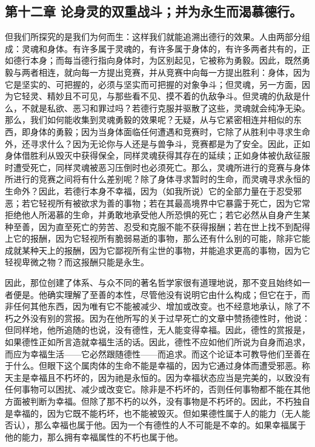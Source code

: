 
\subsection{第十二章 论身灵的双重战斗；并为永生而渴慕德行。}

但我们所探究的是我们为何而生：这样我们就能追溯出德行的效果。人由两部分组成：灵魂和身体。有许多属于灵魂的，有许多属于身体的，有许多两者共有的，正如德行本身；而每当德行指向身体时，为区别起见，它被称为勇毅。因此，既然勇毅与两者相连，就向每一方提出竞赛，并从竞赛中向每一方提出胜利：身体，因为它是坚实的、可把握的，必须与坚实而可把握的对象争斗；但灵魂，另一方面，因为它轻灵、精妙且不可见，与那些看不见、摸不着的仇敌争斗。但灵魂的仇敌是什么，不就是私欲、恶习和罪过吗？若德行克服并驱散了这些，灵魂就会纯净无染。那么，我们如何能收集到灵魂勇毅的效果呢？无疑，从与它紧密相连并相似的东西，即身体的勇毅；因为当身体面临任何遭遇和竞赛时，它除了从胜利中寻求生命外，还寻求什么？因为无论你与人还是与兽争斗，竞赛都是为了安全。因此，正如身体借胜利从毁灭中获得保全，同样灵魂获得其存在的延续；正如身体被仇敌征服时遭受死亡，同样灵魂被恶习压倒时也必须死亡。那么，灵魂所进行的竞赛与身体所进行的竞赛之间将有什么差别呢？除了身体寻求暂时的生命，而灵魂寻求永恒的生命外？因此，若德行本身不幸福，因为（如我所说）它的全部力量在于忍受邪恶；若它轻视所有被欲求为善的事物；若在其最高境界中它暴露于死亡，因为它常拒绝他人所渴慕的生命，并勇敢地承受他人所恐惧的死亡；若它必然从自身产生某种至善，因为直至死亡的劳苦、忍受和克服不能不获得报酬；若在世上找不到配得上它的报酬，因为它轻视所有脆弱易逝的事物，那么还有什么别的可能，除非它能成就某种天上的报酬，因为它鄙视所有尘世的事物，并能追求更高的事物，因为它轻视卑微之物？而这报酬只能是永生。\par

因此，那位创建了体系、与众不同的著名哲学家很有道理地说，那不变且始终如一者便是。他确实理解了至善的本性，尽管他没有说明它由什么构成；但它在于，而非任何其他东西，因为唯有它不能被减少、增加或改变。也不经意地承认，除了不朽之外没有别的赏报。因为在他所写的关于过早死亡的文章中赞扬德性时，他说：但同样地，他所追随的也说，没有德性，无人能变得幸福。因此，德性的赏报是，如果德性正如所言造就幸福生活的话。因此，德性不应如他们所说为自身而追求，而应为幸福生活——它必然跟随德性——而追求。而这个论证本可教导他们至善在于什么。但眼下这个属肉体的生命不能是幸福的，因为它通过身体而遭受邪恶。称天主是幸福且不朽坏的，因为祂是永恒的。因为幸福状态应当是完美的，以致没有任何事物可以困扰、减少或改变它。除非是不朽坏的，否则任何事物都不能在其他方面被判断为幸福。但除了那不朽的以外，没有事物是不朽坏的。因此，不朽独自是幸福的，因为它既不能朽坏，也不能被毁灭。但如果德性属于人的能力（无人能否认），那么幸福也属于他。因为一个有德性的人不可能是不幸的。如果幸福属于他的能力，那么拥有幸福属性的不朽也属于他。\par

